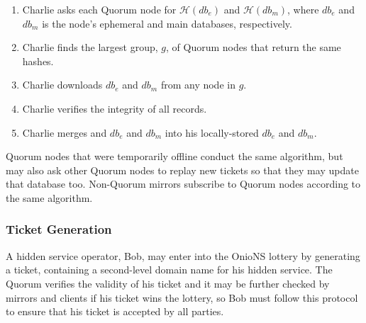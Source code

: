 \documentclass[USenglish,oneside,twocolumn]{article}
\begin{document}
\begin{enumerate}
	\item Charlie asks each Quorum node for $ \mathcal{H}(\mathit{db}_{e}) $ and $ \mathcal{H}(\mathit{db}_{m}) $, where $ \mathit{db}_{e} $ and $ \mathit{db}_{m} $ is the node's ephemeral and main databases, respectively.
	\item Charlie finds the largest group, $ g $, of Quorum nodes that return the same hashes.
	\item Charlie downloads $ \mathit{db}_{e} $ and $ \mathit{db}_{m} $ from any node in $ g $.
	\item Charlie verifies the integrity of all records.
	\item Charlie merges and $ \mathit{db}_{e} $ and $ \mathit{db}_{m} $ into his locally-stored $ \mathit{db}_{e} $ and $ \mathit{db}_{m} $.
\end{enumerate}

Quorum nodes that were temporarily offline conduct the same algorithm, but may also ask other Quorum nodes to replay new tickets so that they may update that database too. Non-Quorum mirrors subscribe to Quorum nodes according to the same algorithm.


\subsubsection{Ticket Generation}
\label{sec:ticketGeneration}

A hidden service operator, Bob, may enter into the OnioNS lottery by generating a ticket, containing a second-level domain name for his hidden service. The Quorum verifies the validity of his ticket and it may be further checked by mirrors and clients if his ticket wins the lottery, so Bob must follow this protocol to ensure that his ticket is accepted by all parties.
\end{document}
